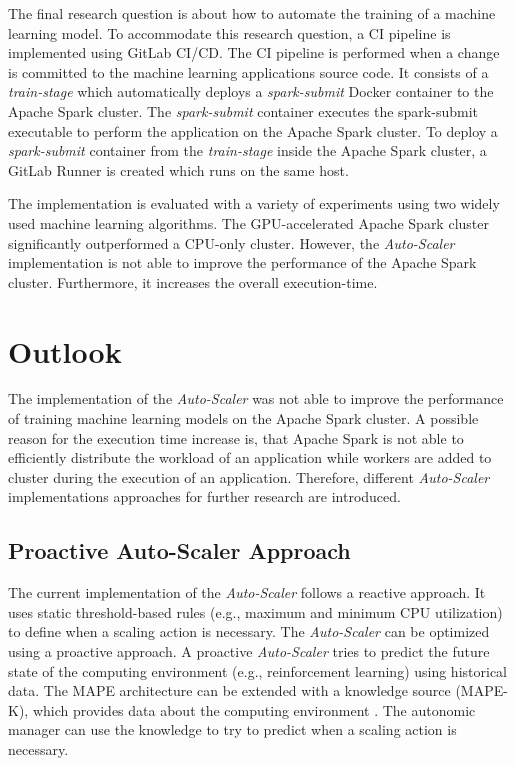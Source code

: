 The final research question is about how to automate the training of a machine learning model.
%
To accommodate this research question, a CI pipeline is implemented using GitLab CI/CD. The CI pipeline is performed when a change is committed to the machine learning applications source code.
It consists of a \textit{train-stage} which automatically deploys a \textit{spark-submit} Docker container to the Apache Spark cluster.
The \textit{spark-submit} container executes the spark-submit executable to perform the application on the Apache Spark cluster.
To deploy a \textit{spark-submit} container from the \textit{train-stage} inside the Apache Spark cluster, a GitLab Runner is created which runs on the same host.


The implementation is evaluated with a variety of experiments using two widely used machine learning algorithms.
The GPU-accelerated Apache Spark cluster significantly outperformed a CPU-only cluster.
However, the \textit{Auto-Scaler} implementation is not able to improve the performance of the Apache Spark cluster. Furthermore, it increases the overall execution-time.


\section{Outlook}
The implementation of the \textit{Auto-Scaler} was not able to improve the performance of training machine learning models on the Apache Spark cluster.
A possible reason for the execution time increase is, that Apache Spark is not able to efficiently distribute the workload of an application while workers are added to cluster during the execution of an application.
Therefore, different \textit{Auto-Scaler} implementations approaches for further research are introduced.


\subsection{Proactive Auto-Scaler Approach}
The current implementation of the \textit{Auto-Scaler} follows a reactive approach. It uses static threshold-based rules (e.g., maximum and minimum CPU utilization) to define when a scaling action is necessary.
The \textit{Auto-Scaler} can be optimized using a proactive approach. A proactive \textit{Auto-Scaler} tries to predict the future state of the computing environment (e.g., reinforcement learning) using historical data.
The MAPE architecture can be extended with a knowledge source (MAPE-K), which provides data about the computing environment \cite{Sinreich2006AnAB}. The autonomic manager can use the knowledge to try to predict when a scaling action is necessary.


